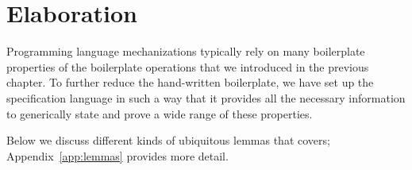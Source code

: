 \chapter{Elaboration}\label{ch:elaboration}
Programming language mechanizations typically rely on many boilerplate
properties of the boilerplate operations that we introduced in the previous
chapter. To further reduce the hand-written boilerplate, we have set up the
\Knot specification language in such a way that it provides all the necessary
information to generically state and prove a wide range of these properties.


Below we discuss different kinds of ubiquitous lemmas that \Needle covers;
Appendix~\ref{app:lemmas} provides more detail.









